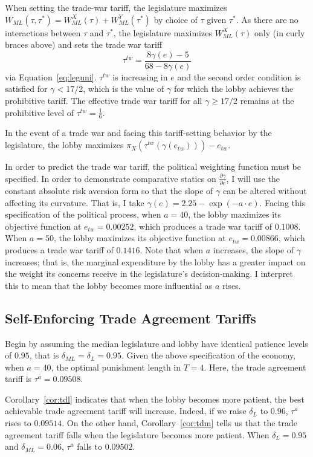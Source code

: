 \documentclass[authoryear, review]{elsarticle}
\newcommand{\ga}{\gamma}
\newcommand{\de}{\delta}
\begin{document}
When setting the trade-war tariff, the legislature maximizes $W_{\mathit{ML}}(\tau, \tau^*) = W_{\mathit{ML}}^X(\tau) + W_{\mathit{ML}}^Y(\tau^*)$ by choice of $\tau$ given $\tau^*$. As there are no interactions between $\tau$ and $\tau^*$, the legislature maximizes $W_{\mathit{ML}}^X(\tau)$ only (in curly braces above) and sets the trade war tariff
\[
  \tau^{tw} = \frac{8\ga(e)-5}{68-8\ga(e)}
\]
via Equation~\ref{eq:leguni}. $\tau^{tw}$ is increasing in $e$ and the second order condition is satisfied for $\ga < 17/2$, which is the value of $\ga$ for which the lobby achieves the prohibitive tariff. The effective trade war tariff for all $\ga \geq 17/2$ remains at the prohibitive level of $\tau^{tw} = \frac{1}{6}$.

In the event of a trade war and facing this tariff-setting behavior by the legislature, the lobby maximizes $\pi_X\left(\tau^{tw}\left(\ga\left(e_{tw}\right)\right)\right) - e_{tw}$.

In order to predict the trade war tariff, the political weighting function must be specified. In order to demonstrate comparative statics on $\frac{\partial \ga}{\partial e}$, I will use the constant absolute risk aversion form so that the slope of $\ga$ can be altered without affecting its curvature. That is, I take $\ga(e) = 2.25 - \exp(-a\cdot e)$. Facing this specification of the political process, when $a=40$, the lobby maximizes its objective function at $e_{tw} = 0.00252$, which produces a trade war tariff of $0.1008$. When $a=50$, the lobby maximizes its objective function at $e_{tw} = 0.00866$, which produces a trade war tariff of $0.1416$. Note that when $a$ increases, the slope of $\ga$ increases; that is, the marginal expenditure by the lobby has a greater impact on the weight its concerns receive in the legislature's decision-making. I interpret this to mean that the lobby becomes more influential as $a$ rises.

\subsection{Self-Enforcing Trade Agreement Tariffs}
Begin by assuming the median legislature and lobby have identical patience levels of $0.95$, that is $\de_{ML} = \de_L = 0.95$. Given the above specification of the economy, when $a=40$, the optimal punishment length in $T=4$. Here, the trade agreement tariff is $\tau^a = 0.09508$.

Corollary~\ref{cor:tdl} indicates that when the lobby becomes more patient, the best achievable trade agreement tariff will increase. Indeed, if we raise $\de_L$ to $0.96$, $\tau^a$ rises to $0.09514$. On the other hand, Corollary~\ref{cor:tdm} tells us that the trade agreement tariff falls when the legislature becomes more patient. When $\de_L = 0.95$ and $\de_{ML} = 0.06$, $\tau^a$ falls to $0.09502$.
\end{document}
